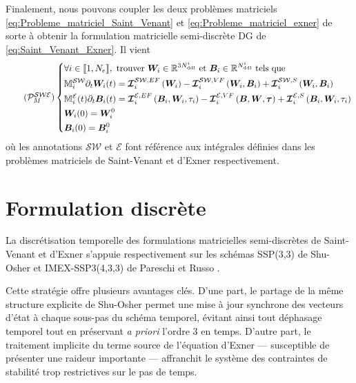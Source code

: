 \documentclass[11pt, a4paper, oneside]{report}
\begin{document}
Finalement, nous pouvons coupler les deux problèmes matriciels \eqref{eq:Probleme_matriciel_Saint_Venant} et \eqref{eq:Probleme_matriciel_exner} de sorte à obtenir la formulation matricielle semi-discrète DG de \eqref{eq:Saint_Venant_Exner}. Il vient
\begin{equation} \tag{$\mathcal{P}_M^\mathcal{SWE}$}
    \left \{
    \begin{aligned}
        & \forall i \in \llbracket 1, N_e \rrbracket, \text{ trouver } \bm{W}_i \in \mathbb{R}^{3N_\text{ddl}^i} \text{ et } \bm{B}_i \in \mathbb{R}^{N_\text{ddl}^i} \text{ tels que} \\
        & \mathbb{M}_i^\mathcal{SW} \partial_t \bm{W}_i(t) = \bm{\mathcal{I}}_i^{\mathcal{SW}, EF} \left( \bm{W}_i \right) - \bm{\mathcal{I}}_i^{\mathcal{SW}, VF} \left( \bm{W}_i, \bm{B}_i \right) + \bm{\mathcal{I}}_i^{\mathcal{SW}, S} \left( \bm{W}_i, \bm{B}_i \right) \\
        & \mathbb{M}_i^\mathcal{E}(t) \partial_t \bm{B}_i(t) = \bm{\mathcal{I}}_i^{\mathcal{E}, EF} \left( \bm{B}_i, \bm{W}_i , \tau_i \right) - \bm{\mathcal{I}}_i^{\mathcal{E}, VF} \left( \bm{B}, \bm{W}, \bm{\tau} \right) + \bm{\mathcal{I}}_i^{\mathcal{E}, S} \left( \bm{B}_i, \bm{W}_i, \tau_i \right) \\
        & \bm{W}_i(0) = \bm{W}_i^0 \\
        & \bm{B}_i(0) = \bm{B}_i^0
    \end{aligned}
    \right .
\end{equation}
où les annotations $\mathcal{SW}$ et $\mathcal{E}$ font référence aux intégrales définies dans les problèmes matriciels de Saint-Venant et d'Exner respectivement.

\section{Formulation discrète}

La discrétisation temporelle des formulations matricielles semi-discrètes de Saint-Venant et d'Exner s'appuie respectivement sur les schémas SSP(3,3) de Shu-Osher et IMEX-SSP3(4,3,3) de Pareschi et Russo \cite{pareschi2005implicit}. 

Cette stratégie offre plusieurs avantages clés. D'une part, le partage de la même structure explicite de Shu-Osher permet une mise à jour synchrone des vecteurs d'état à chaque sous-pas du schéma temporel, évitant ainsi tout déphasage temporel tout en préservant \textit{a priori} l'ordre 3 en temps. D'autre part, le traitement implicite du terme source de l'équation d'Exner — susceptible de présenter une raideur importante — affranchit le système des contraintes de stabilité trop restrictives sur le pas de temps. \\
\end{document}
